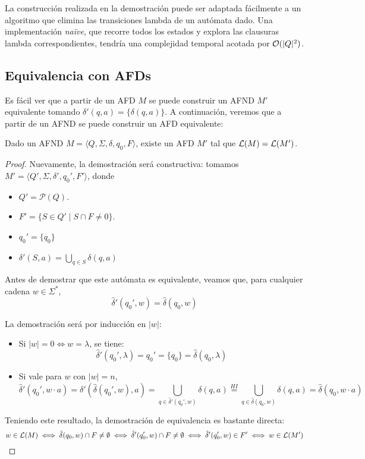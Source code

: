 La construcción realizada en la demostración puede ser adaptada fácilmente a un algoritmo que elimina las transiciones lambda de un autómata dado. Una implementación \textit{naïve}, que recorre todos los estados y explora las clausuras lambda correspondientes, tendría una complejidad temporal acotada por $\mathcal{O}(|Q|^2)$.

\subsection{Equivalencia con AFDs}

Es fácil ver que a partir de un AFD $M$ se puede construir un AFND $M'$ equivalente tomando $\delta'(q, a) = \{\delta(q, a)\}$. A continuación, veremos que a partir de un AFND se puede construir un AFD equivalente:

\begin{theorem*}
    Dado un AFND $M = \langle Q, \Sigma, \delta, q_0, F \rangle$, existe un AFD $M'$ tal que $\mathcal{L}(M) = \mathcal{L}(M')$.
\end{theorem*}
\begin{proof}
    Nuevamente, la demostración será constructiva: tomamos $M' = \langle Q', \Sigma, \delta', q_0', F' \rangle$, donde
    \begin{itemize}
        \item $Q' = \mathcal P (Q)$.
        \item $F' = \{S \in Q' \mid S \cap F \neq 0\}$.
        \item $q_0' = \{q_0\}$
        \item $\delta'(S, a) = \bigcup_{q \in S} \delta(q, a)$
    \end{itemize}

    Antes de demostrar que este autómata es equivalente, veamos que, para cualquier cadena $w \in \Sigma^*$,
    $$\hat \delta'(q_0', w) = \hat \delta(q_0, w)$$
    
    La demostración será por inducción en $|w|$:
    \begin{itemize}
        \item Si $|w| = 0 \iff w = \lambda$, se tiene:
        $$\hat \delta'(q_0', \lambda) = q_0' = \{q_0\} = \hat \delta(q_0, \lambda)$$
        \item Si vale para $w$ con $|w| = n$,
        $$\hat \delta'(q_0', w \cdot a) = \delta'(\hat \delta(q_0', w), a) = \bigcup_{q \in \hat \delta'(q_0', w)} \delta(q, a) \overset{HI}{=} \bigcup_{q \in \hat \delta(q_0, w)} \delta(q, a) = \hat \delta(q_0, w \cdot a)$$
    \end{itemize}

    Teniendo este resultado, la demostración de equivalencia es bastante directa:
    $$w \in \mathcal{L}(M) \iff \hat \delta(q_0, w) \cap F \neq \emptyset \iff \hat \delta'(q_0', w) \cap F \neq \emptyset \iff \hat \delta'(q_0', w) \in F' \iff w \in \mathcal{L}(M')$$
\end{proof}


